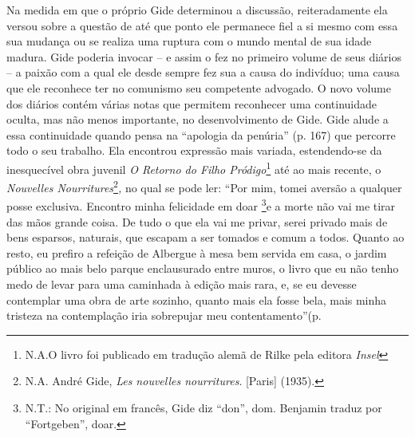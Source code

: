 Na medida em que o próprio Gide determinou a discussão, reiteradamente
ela versou sobre a questão de até que ponto ele permanece fiel a si
mesmo com essa sua mudança ou se realiza uma ruptura com o mundo mental
de sua idade madura. Gide poderia invocar -- e assim o fez no primeiro
volume de seus diários -- a paixão com a qual ele desde sempre fez sua a
causa do indivíduo; uma causa que ele reconhece ter no comunismo seu
competente advogado. O novo volume dos diários contém várias notas que
permitem reconhecer uma continuidade oculta, mas não menos importante,
no desenvolvimento de Gide. Gide alude a essa continuidade quando pensa
na ``apologia da penúria'' (p. 167) que percorre todo o seu trabalho.
Ela encontrou expressão mais variada, estendendo-se da inesquecível obra
juvenil \emph{O Retorno do Filho Pródigo}\footnote{N.A.O livro foi
  publicado em tradução alemã de Rilke pela editora \emph{Insel}} até ao
mais recente, o \emph{Nouvelles Nourritures}\footnote{N.A. André Gide,
  \emph{Les nouvelles nourritures}. {[}Paris{]} (1935).}\emph{,} no qual
se pode ler: ``Por mim, tomei aversão a qualquer posse exclusiva.
Encontro minha felicidade em doar \footnote{N.T.: No original em
  francês, Gide diz ``don'', dom. Benjamin traduz por ``Fortgeben'',
  doar.}e a morte não vai me tirar das mãos grande coisa. De tudo o que
ela vai me privar, serei privado mais de bens esparsos, naturais, que
escapam a ser tomados e comum a todos. Quanto ao resto, eu prefiro a
refeição de Albergue à mesa bem servida em casa, o jardim público ao
mais belo parque enclausurado entre muros, o livro que eu não tenho medo
de levar para uma caminhada à edição mais rara, e, se eu devesse
contemplar uma obra de arte sozinho, quanto mais ela fosse bela, mais
minha tristeza na contemplação iria sobrepujar meu contentamento''(p.
